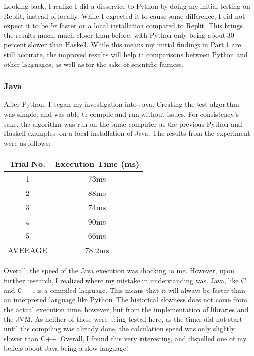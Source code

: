 \documentclass{article}
\begin{document}
    \medskip\noindent Looking back, I realize I did a disservice to Python by doing my initial testing on Replit, instead of locally. While I expected it to cause some difference, I did not expect it to be 5x faster on a local installation compared to Replit. This brings the results much, much closer than before, with Python only being about 30 percent slower than Haskell. While this means my initial findings in Part 1 are still accurate, the improved results will help in comparisons between Python and other languages, as well as for the sake of scientific fairness. 
    
    \subsubsection{Java}
    
    \medskip\noindent After Python, I began my investigation into Java. Creating the test algorithm was simple, and was able to compile and run without issues. For consistency's sake, the algorithm was run on the same computer as the previous Python and Haskell examples, on a local installation of Java. The results from the experiment were as follows: 
            \begin{center}
    \begin{tabular}{||c c|} 
    \hline
   Trial No. & Execution Time (ms)\\ [0.5ex] 
    \hline\hline
    1 & 73ms \\ 
     \hline
    2 & 88ms \\
     \hline
    3 & 74ms\\
    \hline
    4 & 90ms\\ 
     \hline
    5 & 66ms\\
    \hline\hline
    AVERAGE & 78.2ms\\
    \hline
    \end{tabular}
    \end{center}
    
    \medskip\noindent Overall, the speed of the Java execution was shocking to me. However, upon further research, I realized where my mistake in understanding was. Java, like C and C++, is a compiled language. This means that it will always be faster than an interpreted language like Python. The historical slowness does not come from the actual execution time, however, but from the implementation of libraries and the JVM. As neither of these were being tested here, as the timer did not start until the compiling was already done, the calculation speed was only slightly slower than C++. Overall, I found this very interesting, and dispelled one of my beliefs about Java being a slow language!   
    
\end{document}
